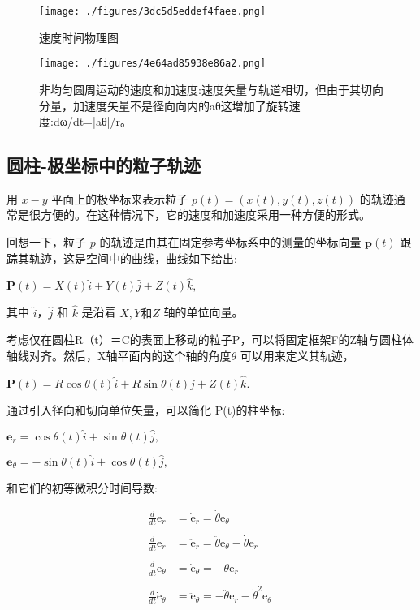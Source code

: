 \begin{figure}[ht]
\centering
\texttt{[image: ./figures/3dc5d5eddef4faee.png]}
\caption{速度时间物理图} \label{fig_YDX_8}
\end{figure}

\begin{figure}[ht]
\centering
\texttt{[image: ./figures/4e64ad85938e86a2.png]}
\caption{非均匀圆周运动的速度和加速度:速度矢量与轨道相切，但由于其切向分量，加速度矢量不是径向向内的aθ这增加了旋转速度:dω/dt=|aθ|/r。} \label{fig_YDX_9}
\end{figure}


\subsection{圆柱-极坐标中的粒子轨迹}

用 $x-y$ 平面上的极坐标来表示粒子 $p(t) = (x(t), y(t), z(t))$ 的轨迹通常是很方便的。在这种情况下，它的速度和加速度采用一种方便的形式。

回想一下，粒子 $p$ 的轨迹是由其在固定参考坐标系中的测量的坐标向量 $\mathbf{p}(t)$ 跟踪其轨迹，这是空间中的曲线，曲线如下给出:

$\mathbf{P}(t) = X(t)\hat{i} + Y(t)\hat{j} + Z(t)\hat{k},$

其中 $\hat{i}$，$\hat{j}$ 和 $\hat{k}$ 是沿着 $X, Y \text{和} Z$ 轴的单位向量。

考虑仅在圆柱R（t）＝C的表面上移动的粒子P，可以将固定框架F的Z轴与圆柱体轴线对齐。然后，X轴平面内的这个轴的角度$\theta$ 可以用来定义其轨迹，

$\mathbf{P}(t) = R \cos \theta(t) \hat{i} + R \sin \theta(t) \hat{j} + Z(t) \hat{k}.$

通过引入径向和切向单位矢量，可以简化 P(t)的柱坐标:

$\mathbf{e}_r = \cos \theta(t) \hat{i} + \sin \theta(t) \hat{j},$


$\mathbf{e}_{\theta} = -\sin \theta(t) \hat{i} + \cos \theta(t) \hat{j},$

和它们的初等微积分时间导数:

\begin{align}
\frac{d}{dt}\mathrm{e}_r &= \dot{\mathrm{e}}_r = \dot{\theta} \mathrm{e}_\theta \\\\
\frac{d}{dt}\dot{\mathrm{e}}_r &=  \ddot{\mathrm{e}}_r = \ddot{\theta} \mathrm{e}_\theta - \dot{\theta} \dot{\mathrm{e}}_r \\\\
\frac{d}{dt}\mathrm{e}_\theta &= \dot{\mathrm{e}}_\theta =  -\dot{\theta} \mathrm{e}_r \\\\
\frac{d}{dt}\dot{\mathrm{e}}_\theta &= \ddot{\mathrm{e}}_\theta = -\ddot{\theta} \mathrm{e}_r - \dot{\theta}^2 \mathrm{e}_\theta ~
\end{align}


